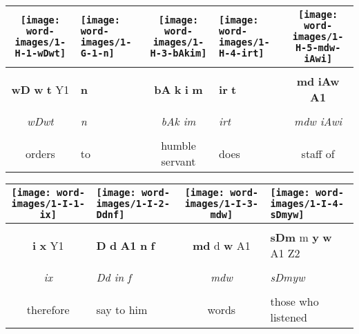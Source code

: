 \pagebreak


\vspace*{\fill}

\begin{tabularx}{\linewidth}{cYcYc}
	\texttt{[image: word-images/1-H-1-wDwt]} &
	\hspace*{-3mm}\texttt{[image: word-images/1-G-1-n]} &
	\texttt{[image: word-images/1-H-3-bAkim]} &
	\hspace*{-4mm} \texttt{[image: word-images/1-H-4-irt]} &
	\texttt{[image: word-images/1-H-5-mdw-iAwi]} \\
	\hline \\ 
	\textbf{wD} \textbf{w} \textbf{t} Y1 &
	\textbf{n} &
	\textbf{bA} \textbf{k} \textbf{i} \textbf{m} &
	\textbf{ir} \textbf{t} &
	\textbf{md} \textbf{iAw} \textbf{A1} \\
	\hline \\ 
	\textit{wDwt} & \textit{n} & \textit{bAk im} & \textit{irt} & \textit{mdw iAwi} \\
	\hline \\ 
	orders & to & humble servant & \hspace*{-4mm}does & staff of 
\end{tabularx}

\vspace{7.5mm}

\begin{tabularx}{\linewidth}{cYcY}
	\hspace*{-2mm}\texttt{[image: word-images/1-I-1-ix]} &
	\hspace*{-15mm} \texttt{[image: word-images/1-I-2-Ddnf]} &
	\hspace*{-13mm}\texttt{[image: word-images/1-I-3-mdw]} &
	\hspace*{-6mm} \texttt{[image: word-images/1-I-4-sDmyw]} \\
	\hline \\ 
	\textbf{i} \textbf{x} Y1 &
	\hspace*{-4mm} \textbf{D} \textbf{d} \textbf{A1} \textbf{n} \textbf{f} &
	\textbf{md} d \textbf{w} A1 &
	\textbf{sDm} m \textbf{y} \textbf{w} A1 Z2 \\
	\hline \\ 
	\textit{ix} & \hspace*{-4mm} \textit{Dd in f} & \textit{mdw} & \textit{sDmyw} \\
	\hline \\ 
	therefore & \hspace*{-4mm} say to him & words & \hspace*{-4mm} those who listened
\end{tabularx}

